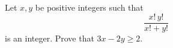 Let $x,y$ be positive integers such that
\[
 \frac{x!\,y!}{x!+y!}
\]
is an integer. Prove that $3x-2y\ge2$.
